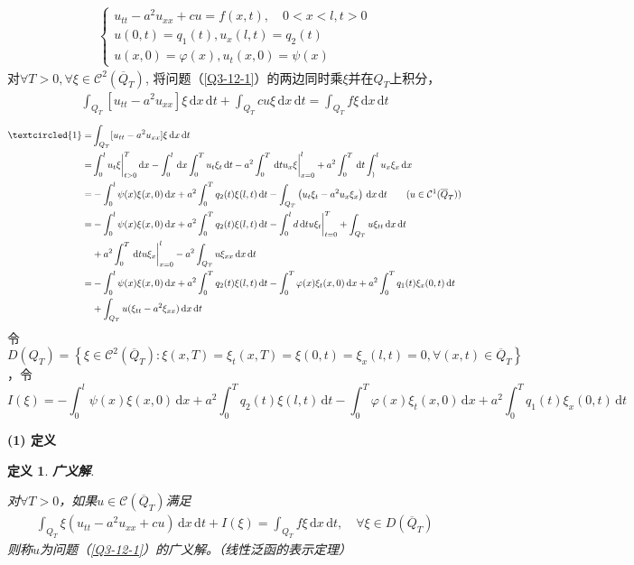 \documentclass[11pt, a4paper]{article}
\theoremstyle{theorem}
\newtheorem{definition}[thm]{定义}
\newcommand{\intd}[1]{\,\mathrm{d}{#1}}
\begin{document}
\begin{align}
\label{Q3-12-1}
    \begin{cases}
    u_{tt} - a^2 u_{xx} + cu = f(x,t), \quad 0 < x < l, t>0 \\
    u(0,t) = q_1(t), u_x(l,t) = q_2(t) \\
    u(x,0) = \varphi(x), u_t(x,0) = \psi(x)
    \end{cases}
\end{align}
对$\forall T > 0, \forall \xi \in \mathcal{C}^2(\overline{Q}_T)$, 将问题（\ref{Q3-12-1}）的两边同时乘$\xi$并在$Q_T$上积分，
\begin{align*}
    \int_{Q_T} [u_{tt} - a^2 u_{xx}] \xi \intd x \intd t + \int_{Q_T} cu \xi \intd x \intd t = \int_{Q_T} f \xi \intd x \intd t
\end{align*}
\begin{align*}
    \textcircled{1} = &\int_{Q_T} [u_{tt} - a^2 u_{xx}] \xi \intd x \intd t \\
    = &\int_0^l u_t \xi \bigg|_{t > 0}^T \intd x - \int_0^l \intd x \int_0^T u_t \xi_t \intd t - a^2 \int_0^T \intd t u_x \xi \bigg|_{x = 0}^l + a^2 \int_0^T \intd t \int_)^l u_x \xi_x \intd x \\
    = &- \int_0^l \psi(x) \xi(x,0) \intd x + a^2 \int_0^T q_2(t) \xi(l,t) \intd t - \int_{Q_T} \left(u_t \xi_t -a^2 u_x \xi_x\right) \intd x \intd t \quad \quad (u \in \mathcal{C}^1(\overline{Q}_T)) \\
    = &- \int_0^l \psi(x) \xi(x,0) \intd x + a^2 \int_0^T q_2(t) \xi(l,t) \intd t - \int_0^l d\intd t u \xi_t \bigg|_{t=0}^T + \int_{Q_T} u \xi_{tt} \intd x \intd t \\
    &+ a^2 \int_0^T \intd t u \xi_x \bigg|_{x=0}^l - a^2 \int_{Q_T} u \xi_{xx} \intd x \intd t \\
    = &- \int_0^l \psi(x) \xi(x,0) \intd x + a^2 \int_0^T q_2(t) \xi(l,t) \intd t - \int_0^T \varphi(x) \xi_t(x,0) \intd x + a^2 \int_0^T q_1(t) \xi_x(0,t) \intd t \\
    &+ \int_{Q_T}  u(\xi_{tt} - a^2 \xi_{xx}) \intd x \intd t
\end{align*}
令$D(Q_T) = \left\{\xi \in \mathcal{C}^2(\overline{Q}_T): \xi(x,T) = \xi_t(x,T)=\xi(0,t)=\xi_x(l,t)=0, \forall (x,t) \in \overline{Q}_T \right\}$，令
$$
I(\xi) = - \int_0^l \psi(x) \xi(x,0) \intd x + a^2 \int_0^T q_2(t) \xi(l,t) \intd t - \int_0^T \varphi(x) \xi_t(x,0) \intd x + a^2 \int_0^T q_1(t) \xi_x(0,t) \intd t
$$

\textbf{(1) 定义}

\begin{definition} \textbf{广义解}.

对$\forall T > 0$，如果$u \in \mathcal{C}(\overline{Q}_T)$满足
\begin{align}
    \int_{Q_T} \xi \left(u_{tt} - a^2 u_{xx} + cu\right) \intd x \intd t + I(\xi) = \int_{Q_T} f \xi \intd x \intd t, \quad \forall \xi \in D(\overline{Q}_T)
\end{align}
则称$u$为问题（\ref{Q3-12-1}）的\emph{广义解}。（线性泛函的表示定理）
\end{definition}
\end{document}
